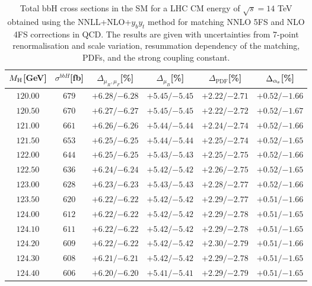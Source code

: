 \begin{table}[ht!]
\caption{Total bbH{} cross sections in the SM for a LHC CM energy of $\sqrt{s}=14$ TeV obtained using the NNLL+NLO+$y_by_t$ method for matching NNLO 5FS and NLO 4FS corrections in QCD. The results are given with uncertainties from 7-point renormalisation and scale variation, resummation dependency of the matching, PDFs, and the strong coupling constant.}
\label{tab:bbH14}
\begin{center}%
\begin{small}%
\begin{tabular}{cccccc}%
\toprule
$M_\mathrm{H}$[GeV] & $\sigma^{bbH}$[fb] & $\Delta_{\mu_{R},\mu_{F}}$[\%] & $\Delta_{\mu_{B}}$[\%] & $\Delta_{\mathrm{PDF}}$[\%] & $\Delta_{\alpha_{\mathrm{s}}}$[\%] \\
\midrule
$120.00$ & $679$ & ${+6.28}/{-6.28}$ & ${+5.45}/{-5.45}$ & ${+2.22}/{-2.71}$ & ${+0.52}/{-1.66}$ \\
$120.50$ & $670$ & ${+6.27}/{-6.27}$ & ${+5.45}/{-5.45}$ & ${+2.22}/{-2.72}$ & ${+0.52}/{-1.67}$ \\
$121.00$ & $661$ & ${+6.26}/{-6.26}$ & ${+5.44}/{-5.44}$ & ${+2.24}/{-2.74}$ & ${+0.52}/{-1.66}$ \\
$121.50$ & $653$ & ${+6.25}/{-6.25}$ & ${+5.44}/{-5.44}$ & ${+2.25}/{-2.74}$ & ${+0.52}/{-1.65}$ \\
$122.00$ & $644$ & ${+6.25}/{-6.25}$ & ${+5.43}/{-5.43}$ & ${+2.25}/{-2.75}$ & ${+0.52}/{-1.66}$ \\
$122.50$ & $636$ & ${+6.24}/{-6.24}$ & ${+5.42}/{-5.42}$ & ${+2.26}/{-2.75}$ & ${+0.52}/{-1.65}$ \\
$123.00$ & $628$ & ${+6.23}/{-6.23}$ & ${+5.43}/{-5.43}$ & ${+2.28}/{-2.77}$ & ${+0.52}/{-1.66}$ \\
$123.50$ & $620$ & ${+6.22}/{-6.22}$ & ${+5.42}/{-5.42}$ & ${+2.29}/{-2.77}$ & ${+0.51}/{-1.66}$ \\
$124.00$ & $612$ & ${+6.22}/{-6.22}$ & ${+5.42}/{-5.42}$ & ${+2.29}/{-2.78}$ & ${+0.51}/{-1.65}$ \\
$124.10$ & $611$ & ${+6.22}/{-6.22}$ & ${+5.42}/{-5.42}$ & ${+2.29}/{-2.78}$ & ${+0.51}/{-1.65}$ \\
$124.20$ & $609$ & ${+6.22}/{-6.22}$ & ${+5.42}/{-5.42}$ & ${+2.30}/{-2.79}$ & ${+0.51}/{-1.66}$ \\
$124.30$ & $608$ & ${+6.21}/{-6.21}$ & ${+5.42}/{-5.42}$ & ${+2.29}/{-2.78}$ & ${+0.51}/{-1.65}$ \\
$124.40$ & $606$ & ${+6.20}/{-6.20}$ & ${+5.41}/{-5.41}$ & ${+2.29}/{-2.79}$ & ${+0.51}/{-1.65}$ \\

\end{tabular}
\end{small}
\end{center}
\end{table}
